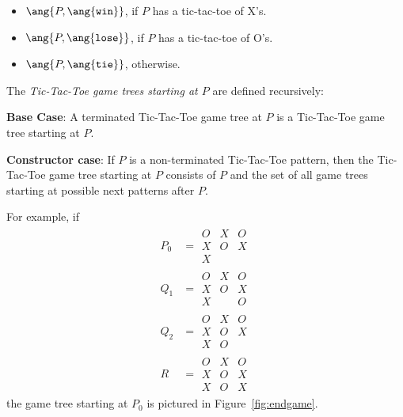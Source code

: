 \begin{definition}
\begin{definition}
\begin{itemize}
\item 
$\ang{P, \ang{\texttt{win}}}$,
if $P$ has a tic-tac-toe of X's.


\item 
$\ang{P, \ang{\texttt{lose}}}$, if $P$ has a tic-tac-toe of O's.


\item $\ang{P, \ang{\texttt{tie}}}$, otherwise.

\end{itemize}

\iffalse
If $Q$ is a possible move from $P$, then the game tree starting at $Q$ is
called a \emph{  Notice
that $\mathcal{G}_P = \emptyset$ iff $P$ is terminated.}
\fi

The \emph{Tic-Tac-Toe game trees starting at $P$} are defined recursively:

\textbf{Base Case}:
A terminated Tic-Tac-Toe game tree at $P$ is a Tic-Tac-Toe game tree
starting at $P$.

\textbf{Constructor case}: If $P$ is a non-terminated Tic-Tac-Toe pattern,
then the Tic-Tac-Toe game tree starting at $P$ consists of $P$ and the set
of all game trees starting at possible next patterns after $P$.
\end{definition}

For example, if
\begin{align*}
P_0 & =  \begin{array}{c|c|c}
                O & X & O\\
         \hline X & O & X\\
         \hline X & &
        \end{array}\\
Q_1 & = \begin{array}{c|c|c}
                O & X & O\\
         \hline X & O & X\\
         \hline X &  & O
        \end{array}\\
Q_2 & = \begin{array}{c|c|c}
                O & X & O\\
         \hline X & O & X\\
         \hline X & O & 
        \end{array}\\
R & = \begin{array}{c|c|c}
                O & X & O\\
         \hline X & O & X\\
         \hline X & O & X
        \end{array}
\end{align*}
the game tree starting at $P_0$ is pictured in Figure~\ref{fig:endgame}.


\end{definition}
